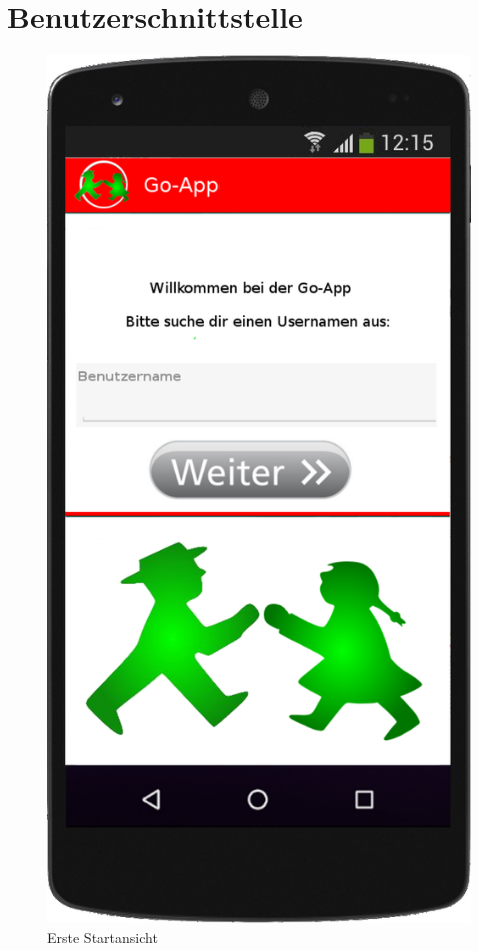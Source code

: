 \section{Benutzerschnittstelle}
\begin{figure}
	\includegraphics[scale=0.2]{resources/images/handy/startansicht.png}
	\caption{Erste Startansicht}
\end{figure}


